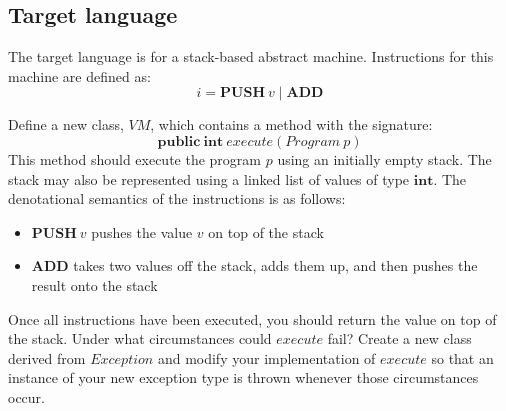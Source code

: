 \documentclass[10pt,a4paper,fleqn]{exam}
\begin{document}
\begin{questions}

\section{Target language}

\question The target language is for a stack-based abstract machine. Instructions for this machine are defined as:
\begin{displaymath}
i = \mathbf{PUSH}~v \mid \mathbf{ADD}
\end{displaymath}
\question Define a new class, $\mathit{VM}$, which contains a method with the signature:
\begin{displaymath}
\mathbf{public}~\mathbf{int}~\mathit{execute}(\mathit{Program}~p)
\end{displaymath}
This method should execute the program $p$ using an initially empty stack. The stack may also be represented using a linked list of values of type $\mathbf{int}$. The denotational semantics of the instructions is as follows:
\begin{itemize}
\item $\mathbf{PUSH}~v$ pushes the value $v$ on top of the stack
\item $\mathbf{ADD}$ takes two values off the stack, adds them up, and then pushes the result onto the stack
\end{itemize}
Once all instructions have been executed, you should return the value on top of the stack.
\question Under what circumstances could $\mathit{execute}$ fail? Create a new class derived from $\mathit{Exception}$ and modify your implementation of $\mathit{execute}$ so that an instance of your new exception type is thrown whenever those circumstances occur.


\end{questions}
\end{document}
